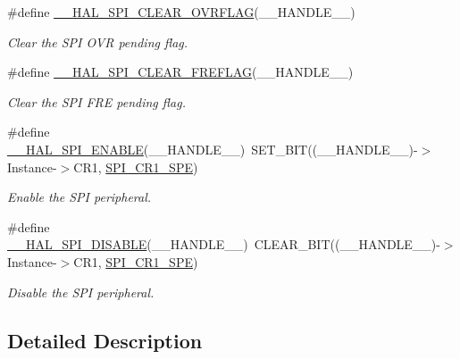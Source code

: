 \begin{DoxyCompactItemize}
\#define \mbox{\hyperlink{group___s_p_i___exported___macros_gaf6af33b1c5d334b9fe7bb778c5b6442e}{\+\_\+\+\_\+\+H\+A\+L\+\_\+\+S\+P\+I\+\_\+\+C\+L\+E\+A\+R\+\_\+\+O\+V\+R\+F\+L\+AG}}(\+\_\+\+\_\+\+H\+A\+N\+D\+L\+E\+\_\+\+\_\+)
\begin{DoxyCompactList}\small\item\em Clear the S\+PI O\+VR pending flag. \end{DoxyCompactList}\item 
\#define \mbox{\hyperlink{group___s_p_i___exported___macros_ga7ff182f5cf6c731318c882351d6d7ac2}{\+\_\+\+\_\+\+H\+A\+L\+\_\+\+S\+P\+I\+\_\+\+C\+L\+E\+A\+R\+\_\+\+F\+R\+E\+F\+L\+AG}}(\+\_\+\+\_\+\+H\+A\+N\+D\+L\+E\+\_\+\+\_\+)
\begin{DoxyCompactList}\small\item\em Clear the S\+PI F\+RE pending flag. \end{DoxyCompactList}\item 
\#define \mbox{\hyperlink{group___s_p_i___exported___macros_ga16d2d73c2b16004499ae8d492e71fd4e}{\+\_\+\+\_\+\+H\+A\+L\+\_\+\+S\+P\+I\+\_\+\+E\+N\+A\+B\+LE}}(\+\_\+\+\_\+\+H\+A\+N\+D\+L\+E\+\_\+\+\_\+)~S\+E\+T\+\_\+\+B\+IT((\+\_\+\+\_\+\+H\+A\+N\+D\+L\+E\+\_\+\+\_\+)-\/$>$Instance-\/$>$C\+R1, \mbox{\hyperlink{group___peripheral___registers___bits___definition_gac5a646d978d3b98eb7c6a5d95d75c3f9}{S\+P\+I\+\_\+\+C\+R1\+\_\+\+S\+PE}})
\begin{DoxyCompactList}\small\item\em Enable the S\+PI peripheral. \end{DoxyCompactList}\item 
\#define \mbox{\hyperlink{group___s_p_i___exported___macros_gaa10d88f87d16de53bd81dfb33bd56959}{\+\_\+\+\_\+\+H\+A\+L\+\_\+\+S\+P\+I\+\_\+\+D\+I\+S\+A\+B\+LE}}(\+\_\+\+\_\+\+H\+A\+N\+D\+L\+E\+\_\+\+\_\+)~C\+L\+E\+A\+R\+\_\+\+B\+IT((\+\_\+\+\_\+\+H\+A\+N\+D\+L\+E\+\_\+\+\_\+)-\/$>$Instance-\/$>$C\+R1, \mbox{\hyperlink{group___peripheral___registers___bits___definition_gac5a646d978d3b98eb7c6a5d95d75c3f9}{S\+P\+I\+\_\+\+C\+R1\+\_\+\+S\+PE}})
\begin{DoxyCompactList}\small\item\em Disable the S\+PI peripheral. \end{DoxyCompactList}\end{DoxyCompactItemize}


\subsection{Detailed Description}


